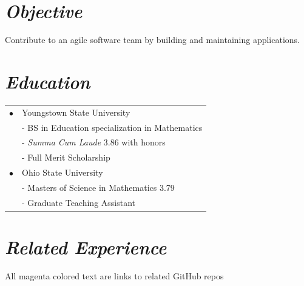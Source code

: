 \documentclass{res}
\begin{document}
\begin{resume}
\large
\vspace{-3.5cm}
\begin{center}\hspace{-3cm}\\ \vspace{0.25cm} \hspace{-3cm} \vspace{0.25cm}\\\hspace{-3cm}\end{center}
\vspace{0.5cm}

\section{\sl  \bf Objective}  %
Contribute to an agile software team by building and maintaining applications.
 
\section{\sl  \bf Education}
\begin{tabular}{p{0\linewidth}p{\linewidth}}
$\bullet$&Youngstown State University\\
&-\,\,BS in Education specialization in Mathematics\\
&-\,\,\emph{Summa Cum Laude} 3.86 with honors\\
&-\,\,Full Merit Scholarship\\
$\bullet$&Ohio State University\\
&-\,\,Masters of Science in Mathematics 3.79\\
&-\,\,Graduate Teaching Assistant
\end{tabular}
 
\section{\sl \bf Related Experience}

All \color{magenta}magenta \color{black}  colored text are links to related GitHub repos 


\end{resume}
\end{document}
